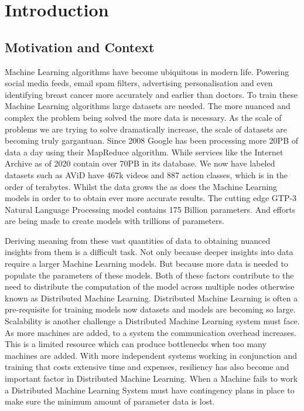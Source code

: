 
\section{Introduction}

\subsection{Motivation and Context}
Machine Learning algorithms have become ubiquitous in modern life. Powering
social media feeds, email spam filters, advertising personalisation and even
identifying breast cancer more accurately and earlier than doctors.
\cite{Mammograms2020} To train these Machine Learning algorithms large datasets
are needed. The more nuanced and complex the problem being solved the more data
is necessary. As the scale of problems we are trying to solve dramatically
increase, the scale of datasets are becoming truly gargantuan. Since 2008 Google
has been processing more 20PB of data a day using their MapReduce algorithm.
\cite{googlemapreduce2008} While services like the Internet Archive as of 2020
contain over 70PB in its database. We now have labeled datasets such as AViD
have 467k videos and 887 action classes, which is in the order of terabytes.
\cite{piergiovanni2020avid} 
Whilst the data grows the as does the Machine Learning models in order to to
obtain ever more accurate results. The cutting edge GTP-3 Natural Language
Processing model contains 175 Billion parameters. \cite{fewshowlearners2020gpt}
And efforts are being made to create models with trillions of parameters.
\cite{rajbhandari2020zero}
\par

Deriving meaning from these vast quantities of data to obtaining nuanced
insights from them is a difficult task. Not only because deeper insights into
data require a larger Machine Learning models. But because more data is needed
to populate the parameters of these models. Both of these factors contribute to
the need to distribute the computation of the model across multiple nodes
otherwise known as Distributed Machine Learning. Distributed Machine Learning is
often a pre-requisite for training models now datasets and models are becoming
so large. \cite{LI2014ParameterServers} Scalability is another challenge a
Distributed Machine Learning system must face. As more machines are added, to a
system the communication overhead increases. This is a limited resource which
can produce bottlenecks when too many machines are added. With more independent
systems working in conjunction and training that costs extensive time and
expenses, resiliency has also become and important factor in Distributed Machine
Learning. When a Machine fails to work a Distributed Machine Learning System
must have contingency plans in place to make sure the minimum amount of
parameter data is lost.
\par

